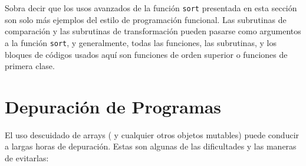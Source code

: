 Sobra decir que los usos avanzados de la función {\tt sort}
presentada en esta sección son solo más ejemplos del
estilo de programación funcional. Las subrutinas de comparación
y las subrutinas de transformación pueden pasarse como 
argumentos a la función {\tt sort}, y generalmente, todas
las funciones, las subrutinas, y los bloques de códigos
usados aquí son funciones de orden superior o funciones
de primera clase.

\section{Depuración de Programas}

El uso descuidado de arrays ( y cualquier otros objetos
mutables) puede conducir a largas horas de depuración. 
Estas son algunas de las dificultades y las maneras de
evitarlas:

